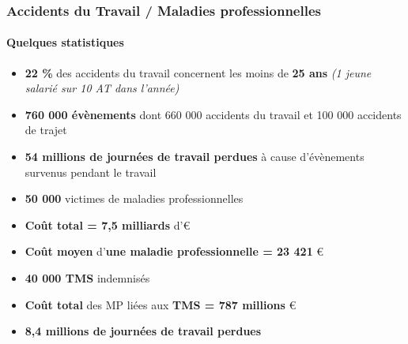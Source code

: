 \documentclass{beamer}
\begin{document}
\begin{frame}
\frametitle{Accidents du Travail / Maladies professionnelles}
\framesubtitle{Quelques statistiques}

\begin{itemize}
\item  \textbf{22 \%} des accidents du travail concernent les moins de \textbf{25 ans} \textit{(1 jeune salarié sur 10 AT dans l’année)}
\item \textbf{760 000 évènements} dont 660 000 accidents du travail et 100 000 accidents de trajet
\item \textbf{54 millions de journées de travail perdues} à cause d’évènements survenus pendant le travail
\item \textbf{50 000} victimes de maladies professionnelles 
\item \textbf{Coût total = 7,5 milliards} d’\euro{}
\item \textbf{Coût moyen} d’\textbf{une maladie professionnelle = 23 421} \euro{}
\item \textbf{40 000 TMS} indemnisés
\item \textbf{Coût total} des MP liées aux \textbf{TMS = 787 millions} \euro{}
\item \textbf{8,4 millions de journées de travail perdues} 
\end{itemize}
\end{frame}
\end{document}
